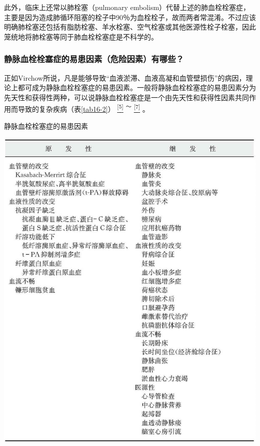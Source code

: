 此外，临床上还常以肺栓塞（pulmonary
embolism）代替上述的肺血栓栓塞症，主要是因为造成肺循环阻塞的栓子中90％为血栓栓子，故而两者常混淆。不过应该明确肺栓塞还包括有脂肪栓塞、羊水栓塞、空气栓塞或其他医源性栓子栓塞，因此笼统地将肺栓塞等同于肺血栓栓塞症是不科学的。

\subsubsection{静脉血栓栓塞症的易患因素（危险因素）有哪些？}

正如Virchow所说，凡是能够导致“血液淤滞、血液高凝和血管壁损伤”的病因，理论上都可成为静脉血栓栓塞症的易患因素。一般将静脉血栓栓塞症的易患因素分为先天性和获得性两种，可以说静脉血栓栓塞症是一个由先天性和获得性因素共同作用而导致的复杂疾病（表\ref{tab16-2}）
\protect\hyperlink{text00022.htmlux5cux23ch5-21}{\textsuperscript{{[}5{]}}}
\textsuperscript{～}
\protect\hyperlink{text00022.htmlux5cux23ch7-21}{\textsuperscript{{[}7{]}}}
。

\begin{table}[htbp]
\centering
\caption{静脉血栓栓塞症的易患因素}
\label{tab16-2}
\includegraphics[width=\textwidth,height=\textheight,keepaspectratio]{./images/Image00117.jpg}
\end{table}

